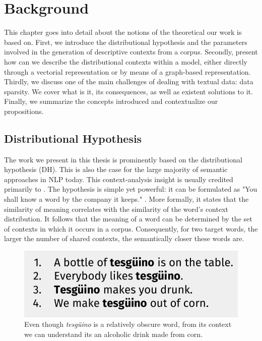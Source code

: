 \chapter{Background}
\label{chap:backgnd}
\begin{abstractchap}
This chapter goes into detail about the notions of the theoretical our work is based on. First, we introduce the distributional hypothesis and the parameters involved in the generation of descriptive contexts from a corpus. Secondly, present how can we describe the distributional contexts within a model, either directly through a vectorial representation or by means of a graph-based representation. Thirdly, we discuss one of the main challenges of dealing with textual data: data sparsity. We cover what is it, its consequences, as well as existent solutions to it. Finally, we summarize the concepts introduced and contextualize our propositions.
\end{abstractchap}
\minitoc

\section{Distributional Hypothesis}
The work we present in this thesis is prominently based on the distributional hypothesis (DH). This is also the case for the large majority of semantic approaches in NLP today. This context-analysis insight is usually credited primarily to \cite{harris1954}. The hypothesis is simple yet powerful: it can be formulated as "You shall know a word by the company it keeps." \cite{firth57synopsis}. More formally, it states that the similarity of meaning correlates with the similarity of the word's context distribution. It follows that the meaning of a word can be determined by the set of contexts in which it occurs in a corpus. Consequently, for two target words, the larger the number of shared contexts, the semantically closer these words are. 

\begin{figure}
\centering
\includegraphics[width=.6\linewidth]{images/Chapitre2/tejuino.pdf}
\caption{Even though \textit{tesg\"{u}ino} is a relatively obscure word, from its context we can understand its an alcoholic drink made from corn.}
\label{fig:tejuino}
\end{figure}


